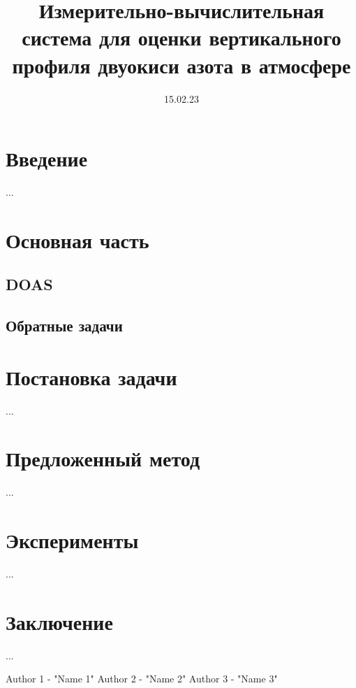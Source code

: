 \documentclass[a4paper,12pt]{article}
\title{Измерительно-вычислительная система для оценки вертикального профиля двуокиси азота в атмосфере}
\date{15.02.23}
\theoremstyle{plain}
\theoremstyle{definition}
\theoremstyle{remark}
\begin{document}
\maketitle
\tableofcontents
\newpage
\section{Введение}
...
\section{Основная часть}
\subsection{DOAS}
\subsection{Обратные задачи}
\section{Постановка задачи}
...
\section{Предложенный метод}
...
\section{Эксперименты}
...
\section{Заключение}
...

\newpage
{}
\begin{thebibliography}{}
      Author 1  -  "Name 1"
      Author 2  -  "Name 2"
      Author 3  -  "Name 3"
\end{thebibliography}
\end{document}

